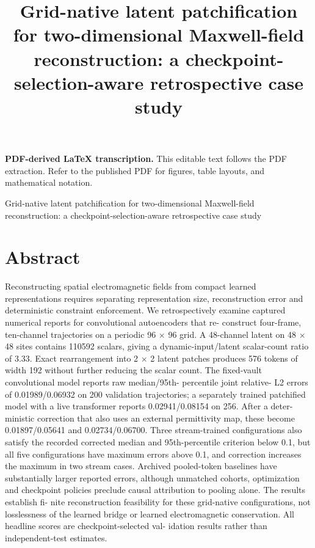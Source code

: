\documentclass[11pt]{article}
\title{Grid-native latent patchification for two-dimensional Maxwell-field reconstruction: a checkpoint-selection-aware retrospective case study}
\author{}
\date{}
\begin{document}
\maketitle
\noindent\textbf{PDF-derived LaTeX transcription.} This editable text follows the PDF extraction. Refer to the published PDF for figures, table layouts, and mathematical notation.


Grid-native latent patchification for two-dimensional Maxwell-field
reconstruction: a checkpoint-selection-aware retrospective case
study

\section*{Abstract}

Reconstructing spatial electromagnetic fields from compact learned representations requires
separating representation size, reconstruction error and deterministic constraint enforcement.
We retrospectively examine captured numerical reports for convolutional autoencoders that re-
construct four-frame, ten-channel trajectories on a periodic 96 \ensuremath{\times} 96 grid. A 48-channel latent
on 48 \ensuremath{\times} 48 sites contains 110592 scalars, giving a dynamic-input/latent scalar-count ratio of
3.33. Exact rearrangement into 2 \ensuremath{\times} 2 latent patches produces 576 tokens of width 192 without
further reducing the scalar count. The fixed-vault convolutional model reports raw median/95th-
percentile joint relative- L2 errors of 0.01989/0.06932 on 200 validation trajectories; a separately
trained patchified model with a live transformer reports 0.02941/0.08154 on 256. After a deter-
ministic correction that also uses an external permittivity map, these become 0.01897/0.05641
and 0.02734/0.06700. Three stream-trained configurations also satisfy the recorded corrected
median and 95th-percentile criterion below 0.1, but all five configurations have maximum errors
above 0.1, and correction increases the maximum in two stream cases. Archived pooled-token
baselines have substantially larger reported errors, although unmatched cohorts, optimization
and checkpoint policies preclude causal attribution to pooling alone. The results establish fi-
nite reconstruction feasibility for these grid-native configurations, not losslessness of the learned
bridge or learned electromagnetic conservation. All headline scores are checkpoint-selected val-
idation results rather than independent-test estimates.
\end{document}
